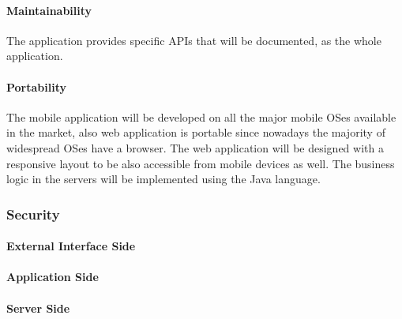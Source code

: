 \documentclass[a4paper,12pt]{article}%
\begin{document}
\paragraph{Maintainability} The application provides specific APIs that will be documented, as the whole application.
\paragraph{Portability} The mobile application will be developed on all the major mobile OSes available in the market, also web application is portable since nowadays the majority of widespread OSes have a browser. The web application will be designed with a responsive layout to be also accessible from mobile devices as well. The business logic in the servers will be implemented using the Java language.
\subsubsection{Security}
\paragraph{External Interface Side}
\paragraph{Application Side}
\paragraph{Server Side}
\end{document}
